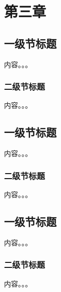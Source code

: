 \chapter{第三章}

\section{一级节标题}

内容。。。

\subsection{二级节标题}

内容。。。

\section{一级节标题}

内容。。。

\subsection{二级节标题}

内容。。。

\section{一级节标题}

内容。。。

\subsection{二级节标题}

内容。。。